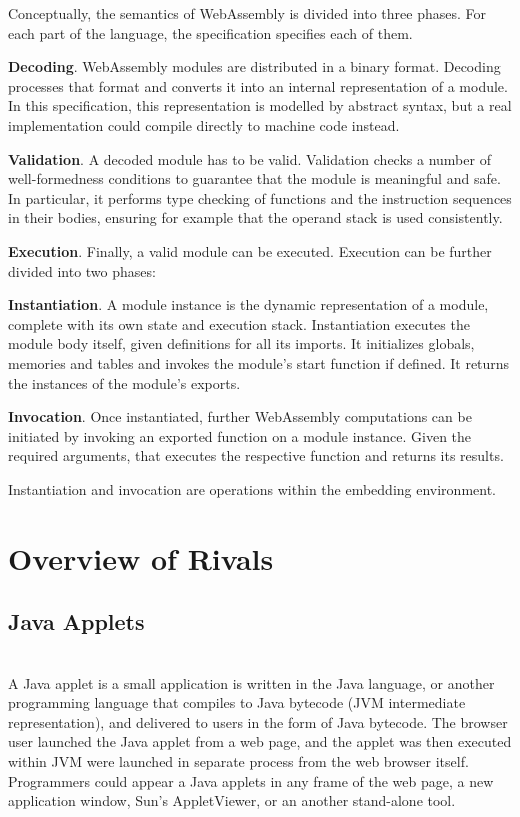 \indent Conceptually, the semantics of WebAssembly is divided into three phases. For each part of the language, the specification specifies each of them.

\textbf{Decoding}. WebAssembly modules are distributed in a binary format. Decoding processes that format and converts it into an internal representation of a module. In this specification, this representation is modelled by abstract syntax, but a real implementation could compile directly to machine code instead.
  
\textbf{Validation}. A decoded module has to be valid. Validation checks a number of well-formedness conditions to guarantee that the module is meaningful and safe. In particular, it performs type checking of functions and the instruction sequences in their bodies, ensuring for example that the operand stack is used consistently.

\textbf{Execution}. Finally, a valid module can be executed. Execution can be further divided into two phases:

\textbf{Instantiation}. A module instance is the dynamic representation of a module, complete with its own state and execution stack. Instantiation executes the module body itself, given definitions for all its imports. It initializes globals, memories and tables and invokes the module’s start function if defined. It returns the instances of the module’s exports.

\textbf{Invocation}. Once instantiated, further WebAssembly computations can be initiated by invoking an exported function on a module instance. Given the required arguments, that executes the respective function and returns its results.

Instantiation and invocation are operations within the embedding environment.

\section{Overview of Rivals}
\subsection{Java Applets} \mbox{}\\
\indent A Java applet is a small application is written in the Java language, or another programming language that compiles to Java bytecode (JVM intermediate representation), and delivered to users in the form of Java bytecode. 
The browser user launched the Java applet from a web page, and the applet was then executed within JVM were launched in separate process from the web browser itself. 
Programmers could appear a Java applets in any frame of the web page, a new application window, Sun's AppletViewer, or an another stand-alone tool.

